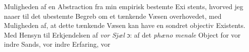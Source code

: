 \documentclass[12pt,a4paper]{book}
\begin{document}
Muligheden af en Abstraction fra min empirisk bestemte Exi\-%
stents, hvorved jeg naaer til det ubestemte Begreb om et
tænkende Væsen overhovedet, med Muligheden af, at dette
tænkende Væsen kan have en sondret objectiv Existents.
Med Hensyn til Erkjendelsen af \emph{vor Sjæl} ɔ: af det \emph{phæno\-%
menale} Object for vor indre Sands, vor indre Erfaring, vor
%
%
\end{document}
